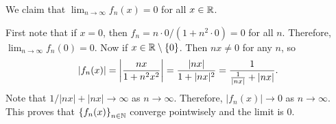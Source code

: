 \documentclass[12pt]{article}
\begin{document}
\begin{fproof}[1(a)]
    We claim that \(\lim_{n\to\infty} f_n(x) = 0\) for all \(x \in \mathbb {R}\).

    First note that if \(x = 0\), then \(f_n = n \cdot 0/(1+n^2 \cdot 0) = 0\) for all \(n\).
    Therefore, \(\lim_{n\to\infty}f_n(0) = 0\).
    Now if \(x \in \mathbb {R}\setminus\{0\}\).
    Then \(nx \neq 0\) for any \(n\), so
    \begin{align*}
        \left\lvert f_n(x) \right\rvert 
        = \left\lvert \frac{nx}{1+n^2x^2} \right\rvert 
        = \frac{\left\lvert nx \right\rvert}{1+|nx|^2}
        = \frac{1}{\frac{1}{|nx|} + |nx|}.
    \end{align*}
    Note that \(1/|nx| + |nx| \to \infty\) as \(n \to \infty\).
    Therefore, \(|f_n(x)| \to 0\) as \(n \to \infty\).
    This proves that \(\left\{ f_n(x) \right\}_{n \in \mathbb {N}}\) converge pointwisely and the limit is 0.
\end{fproof}
\end{document}
